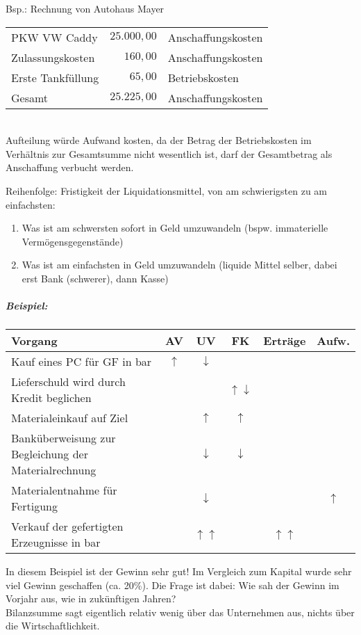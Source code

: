 \begin{itemize}
Bsp.: Rechnung von Autohaus Mayer\\
\begin{tabular}{l r l}
PKW VW Caddy & $25.000,00$ & Anschaffungskosten\\
Zulassungskosten & $160,00$ & Anschaffungskosten\\
Erste Tankfüllung & $65,00$ & Betriebskosten\\
\hline
Gesamt	& $25.225,00$	& Anschaffungskosten\\
\end{tabular}\\
Aufteilung würde Aufwand kosten, da der Betrag der Betriebskosten im Verhältnis zur Gesamtsumme nicht wesentlich ist, darf der Gesamtbetrag als Anschaffung verbucht werden.
\end{itemize}
Reihenfolge: Fristigkeit der Liquidationsmittel, von am schwierigsten zu am einfachsten: 
\begin{enumerate}
\item Was ist am schwersten sofort in Geld umzuwandeln (bspw. immaterielle Vermögensgegenstände)
\item Was ist am einfachsten in Geld umzuwandeln (liquide Mittel selber, dabei erst Bank (schwerer), dann Kasse)
\end{enumerate}
\subparagraph{Beispiel:} \parskp
\begin{tabular}{L{0.5} c c c c c}
Vorgang & AV & UV & FK & Erträge & Aufw.\\
\hline
Kauf eines PC für GF in bar & $\uparrow$ & $\downarrow$ \\
Lieferschuld wird durch Kredit beglichen & & & $\uparrow \downarrow$ \\
Materialeinkauf auf Ziel & & $\uparrow$ & $\uparrow$\\
Banküberweisung zur Begleichung der Materialrechnung & &$\downarrow$ & $\downarrow$\\
Materialentnahme für Fertigung & & $\downarrow$ & & & $\uparrow$\\
Verkauf der gefertigten Erzeugnisse in bar & &$\uparrow\uparrow$ & & $\uparrow\uparrow$ & \\
\end{tabular}
In diesem Beispiel ist der Gewinn sehr gut! Im Vergleich zum Kapital wurde sehr viel Gewinn geschaffen (ca. 20\%). Die Frage ist dabei: Wie sah der Gewinn im Vorjahr aus, wie in zukünftigen Jahren?\\
Bilanzsumme sagt eigentlich relativ wenig über das Unternehmen aus, nichts über die Wirtschaftlichkeit.

